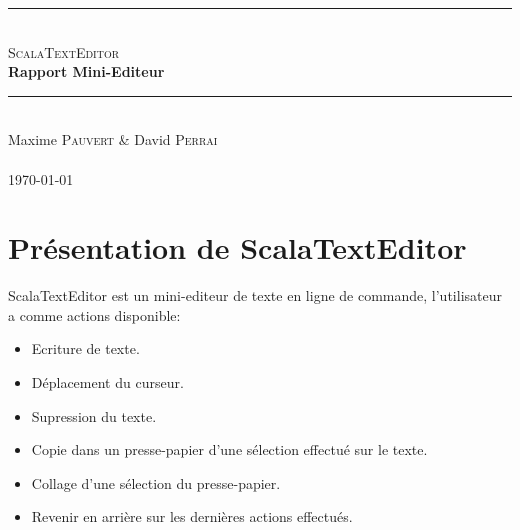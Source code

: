 \documentclass[pdftex,12pt,a4paper]{article}
\author{\docauthor}
\title{\doctitle}
\date{\today}
\newcommand{\docauthor}{
            Maxime \textsc{Pauvert} 
     		\& David \textsc{Perrai} \\
                       
 }
\newcommand{\doctitle}{ScalaTextEditor}
\newcommand{\HRule}{\rule{\linewidth}{0.5mm}}
\begin{document}
  \begin{titlepage}
    \begin{center}

      \HRule \\[0.5cm]
      \textsc{\LARGE \doctitle \\[0.5cm]}
      \textbf{\Large Rapport Mini-Editeur \\[0.5cm]}
      \HRule \\[1.25cm]

		\docauthor
      ~\\[1.0cm]
      \today

      \vfill{}
      
    \end{center}
  \end{titlepage}

\tableofcontents
\setcounter{page}{1}
\newpage
	

  
	\begin{abstract}
    Dans le cadre du cour de Génie logiciel il nous a été demandé de mettre en oeuvre un projet de mini-editeur de texte. Ce projet a pour but de mettre en place les connaissances apprises durant le cours. Ainsi nous avons développé le mini-editor àà l'aide d'une modélisation UML pour la conception en amont et au cour du développement, avec la mise en place de patrons de conception. Nous vous présenterons le programme et ses fonctionnalités puis la conception de l'architecture  à travers les diagrammes UML et enfin nous expliciterons les différents patrons et leurs rôles dans le programme ainsi que certains choix d'implémentation.
    \end{abstract}
    
    \section{Présentation de ScalaTextEditor}
    	ScalaTextEditor est un mini-editeur de texte en ligne de commande, l'utilisateur a comme actions disponible:\\
        \begin{itemize}
        	\item Ecriture de texte.
            \item Déplacement du curseur.
            \item Supression du texte.
            \item Copie dans un presse-papier d'une sélection effectué sur le texte.
            \item Collage d'une sélection du presse-papier. 
            \item Revenir en arrière sur les dernières actions effectués. 
		\end{itemize}
   
\end{document}
